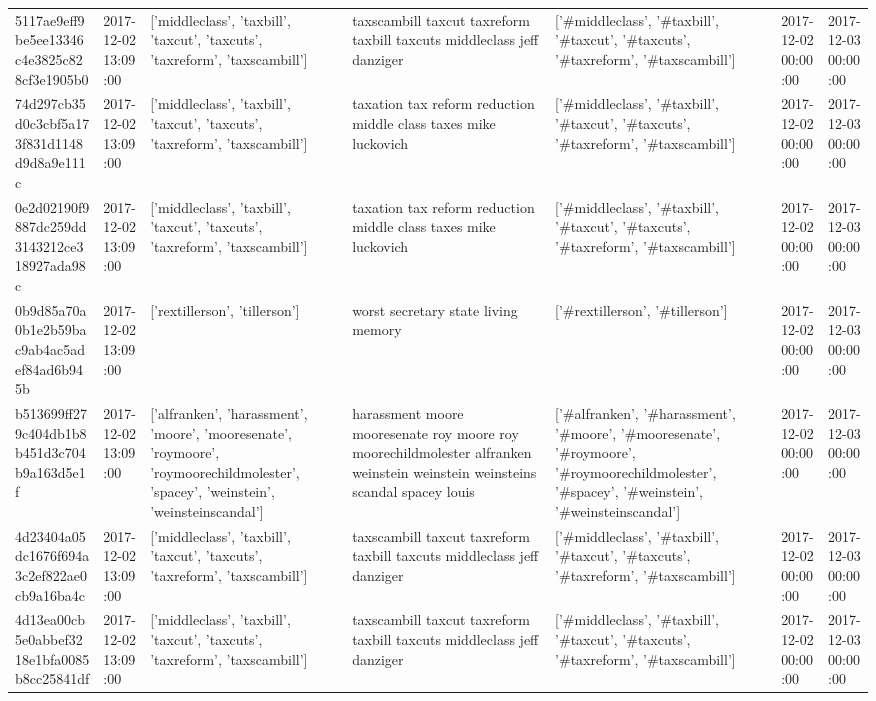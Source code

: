 \begin{tabular}{lllllll}
5117ae9eff9be5ee13346c4e3825c828cf3e1905b0 & 2017-12-02 13:09:00 & ['middleclass', 'taxbill', 'taxcut', 'taxcuts', 'taxreform', 'taxscambill'] & taxscambill taxcut taxreform taxbill taxcuts middleclass jeff danziger & ['#middleclass', '#taxbill', '#taxcut', '#taxcuts', '#taxreform', '#taxscambill'] & 2017-12-02 00:00:00 & 2017-12-03 00:00:00 \\
74d297cb35d0c3cbf5a173f831d1148d9d8a9e111c & 2017-12-02 13:09:00 & ['middleclass', 'taxbill', 'taxcut', 'taxcuts', 'taxreform', 'taxscambill'] & taxation tax reform reduction middle class taxes mike luckovich & ['#middleclass', '#taxbill', '#taxcut', '#taxcuts', '#taxreform', '#taxscambill'] & 2017-12-02 00:00:00 & 2017-12-03 00:00:00 \\
0e2d02190f9887dc259dd3143212ce318927ada98c & 2017-12-02 13:09:00 & ['middleclass', 'taxbill', 'taxcut', 'taxcuts', 'taxreform', 'taxscambill'] & taxation tax reform reduction middle class taxes mike luckovich & ['#middleclass', '#taxbill', '#taxcut', '#taxcuts', '#taxreform', '#taxscambill'] & 2017-12-02 00:00:00 & 2017-12-03 00:00:00 \\
0b9d85a70a0b1e2b59bac9ab4ac5adef84ad6b945b & 2017-12-02 13:09:00 & ['rextillerson', 'tillerson'] & worst secretary state living memory & ['#rextillerson', '#tillerson'] & 2017-12-02 00:00:00 & 2017-12-03 00:00:00 \\
b513699ff279c404db1b8b451d3c704b9a163d5e1f & 2017-12-02 13:09:00 & ['alfranken', 'harassment', 'moore', 'mooresenate', 'roymoore', 'roymoorechildmolester', 'spacey', 'weinstein', 'weinsteinscandal'] & harassment moore mooresenate roy moore roy moorechildmolester alfranken weinstein weinstein weinsteins scandal spacey louis & ['#alfranken', '#harassment', '#moore', '#mooresenate', '#roymoore', '#roymoorechildmolester', '#spacey', '#weinstein', '#weinsteinscandal'] & 2017-12-02 00:00:00 & 2017-12-03 00:00:00 \\
4d23404a05dc1676f694a3c2ef822ae0cb9a16ba4c & 2017-12-02 13:09:00 & ['middleclass', 'taxbill', 'taxcut', 'taxcuts', 'taxreform', 'taxscambill'] & taxscambill taxcut taxreform taxbill taxcuts middleclass jeff danziger & ['#middleclass', '#taxbill', '#taxcut', '#taxcuts', '#taxreform', '#taxscambill'] & 2017-12-02 00:00:00 & 2017-12-03 00:00:00 \\
4d13ea00cb5e0abbef3218e1bfa0085b8cc25841df & 2017-12-02 13:09:00 & ['middleclass', 'taxbill', 'taxcut', 'taxcuts', 'taxreform', 'taxscambill'] & taxscambill taxcut taxreform taxbill taxcuts middleclass jeff danziger & ['#middleclass', '#taxbill', '#taxcut', '#taxcuts', '#taxreform', '#taxscambill'] & 2017-12-02 00:00:00 & 2017-12-03 00:00:00 \\

\end{tabular}
